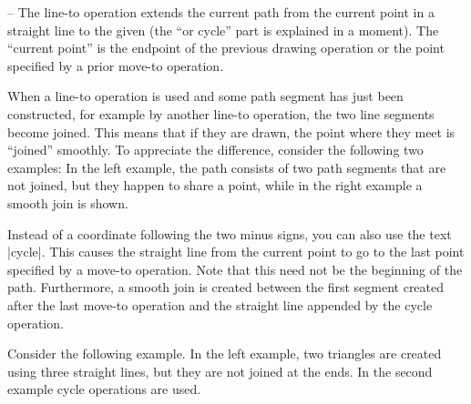 \begin{pathoperation}{--}{}
  The line-to operation extends the current path from the current
  point in a straight line to the given  (the ``or
  cycle'' part is explained in a moment). The ``current
  point'' is the endpoint of the previous drawing operation or the point
  specified by a prior move-to operation.

  When a line-to operation is used and some path segment has just been
  constructed, for example by another line-to operation, the two line
  segments become joined. This means that if they are drawn, the point
  where they meet is ``joined'' smoothly. To appreciate the difference,
  consider the following two examples: In the left example, the path
  consists of two path segments that are not joined, but they happen to
  share a point, while in the right example a smooth join is shown.

\begin{codeexample}[]
\end{codeexample}

  Instead of a coordinate following the two minus signs, you can also
  use the text |cycle|. This causes the straight line from the current 
  point to go to the last point specified by a move-to operation. Note
  that this need not be the beginning of the path. Furthermore, a
  smooth join is created between the first segment created after the
  last move-to operation and the straight line appended by the cycle
  operation. 

  Consider the following example. In the left example, two triangles are
  created using three straight lines, but they are not joined at the
  ends. In the second example cycle operations are used.

\begin{codeexample}[]
\end{codeexample}
\end{pathoperation}

